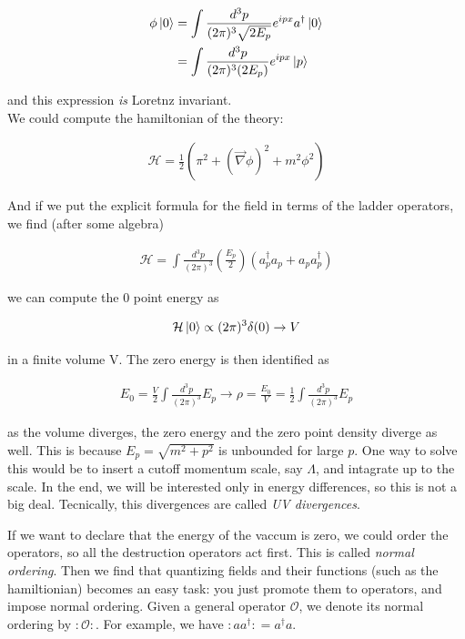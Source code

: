 \documentclass{report}
\begin{document}
\begin{align}
    \phi\ket{0} &= \int \frac{d^3p}{(2\pi)^3\sqrt{2E_p}}e^{ipx}a^{\dagger}\ket{0} \\
    &= \int \frac{d^3p}{(2\pi)^3(2E_p)}e^{ipx}\ket{p} 
\end{align}

and this expression \emph{is} Loretnz invariant. \\

We could compute the hamiltonian of the theory: 

\begin{align}
    \mathcal{H} = \frac{1}{2}(\pi^2 + (\vec{\nabla}\phi)^2+ m^2\phi^2)
\end{align}

And if we put the explicit formula for the field in terms of the ladder operators, we find (after some algebra)

\begin{align}
    \mathcal{H} = \int \frac{d^3p}{(2\pi)^3}\left(\frac{E_p}{2} \right)(a^\dagger_p a_p + a_pa^\dagger_p) 
\end{align}

we can compute the 0 point energy as 

\begin{align}
    \mathcal{H}\ket{0} \propto (2\pi)^3 \delta(0) \rightarrow V
\end{align}

in a finite volume V. The zero energy is then identified as 

\begin{align}
    E_{0} = \frac{V}{2}\int \frac{d^3p}{(2\pi)^3}E_p \rightarrow \rho = \frac{E_0}{V} = \frac{1}{2}\int \frac{d^3p}{(2\pi)^3}E_p 
\end{align}

as the volume diverges, the zero energy and the zero point density diverge as well. This is because \(E_p = \sqrt{m^2 + p^2}\) is unbounded for large \(p\). One way to solve this would be to insert a cutoff momentum scale, say \(\Lambda\), and intagrate up to the scale. In the end, we will be interested only in energy differences, so this is not a big deal. Tecnically, this divergences are called \emph{UV divergences}.

If we want to declare that the energy of the vaccum is zero, we could order the operators, so all the destruction operators act first. This is called \emph{normal ordering}. Then we find that quantizing fields and their functions (such as the hamiltionian) becomes an easy task: you just promote them to operators, and impose normal ordering. Given a general operator \(\mathcal{O}\), we denote its normal ordering by \(:\mathcal{O}:\). For example, we have \(:aa^\dagger: = a^\dagger a\). 
\end{document}

